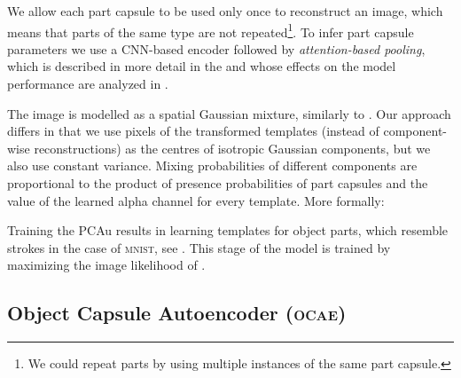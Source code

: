 \documentclass{article}
\begin{document}
We allow each part capsule to be used only once to reconstruct an image, which means that parts of the same type are not repeated\footnote{We could repeat parts by using multiple instances of the same part capsule.}.
To infer part capsule parameters we use a \gls{CNN}-based encoder followed by \textit{attention-based pooling}, which is described in more detail in the  and whose effects on the model performance are analyzed in .

The image is modelled as a spatial Gaussian mixture, similarly to \cite{Greff2019multi, Burgess2019monet, Engelcke2019genesis}.
Our approach differs in that we use pixels of the transformed templates (instead of component-wise reconstructions) as the centres of isotropic Gaussian components, but we also use constant variance.
Mixing probabilities of different components are proportional to the product of presence probabilities of part capsules and the value of the learned alpha channel for every template.
More formally:

Training the \gls{PCAu} results in learning templates for object parts, which resemble strokes in the case of \textsc{mnist}, see .
This stage of the model is trained by maximizing the image likelihood of .

\subsection{Object Capsule Autoencoder (\textsc{ocae})}
\label{sec:ocae}
\end{document}
